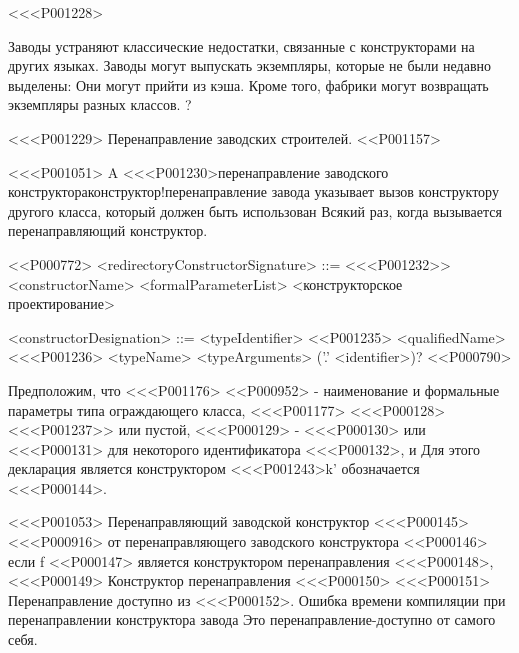 {{{{{{{{{{{<<<P001228>{%
Заводы устраняют классические недостатки, связанные с конструкторами
на других языках.
Заводы могут выпускать экземпляры, которые не были недавно выделены:
Они могут прийти из кэша.
Кроме того, фабрики могут возвращать экземпляры разных классов.
?


<<<P001229> Перенаправление заводских строителей.
<<P001157>

<<<P001051>%
A <<<P001230>{перенаправление заводского конструктора}{конструктор!перенаправление завода}
указывает вызов конструктору другого класса, который должен быть использован
Всякий раз, когда вызывается перенаправляющий конструктор.

<<P000772>
<redirectoryConstructorSignature> ::= \gnewline{}
<<<P001232>> \FACTORY{} <constructorName> <formalParameterList> \gnewline{}
<конструкторское проектирование>

<constructorDesignation> ::= <typeIdentifier>
<<P001235> <qualifiedName>
<<<P001236> <typeName> <typeArguments> ('.' <identifier>)?
<<P000790>

Предположим, что
<<<P001176>%
<<P000952>
- наименование и формальные параметры типа ограждающего класса,
<<<P001177>%
<<<P000128> <<<P001237>> или пустой,
<<<P000129> - <<<P000130> или <<<P000131> для некоторого идентификатора <<<P000132>,
и 
Для этого декларация является конструктором <<<P001243>{k'} обозначается <<<P000144>.

<<<P001053>%
Перенаправляющий заводской конструктор <<<P000145> <<<P000916>
от перенаправляющего заводского конструктора <<P000146> если {f}
<<P000147> является конструктором перенаправления <<<P000148>,
<<<P000149> Конструктор перенаправления <<<P000150>
<<<P000151> Перенаправление доступно из <<<P000152>.
Ошибка времени компиляции при перенаправлении конструктора завода
Это перенаправление-доступно от самого себя.

}}}}}}}}}}}}
